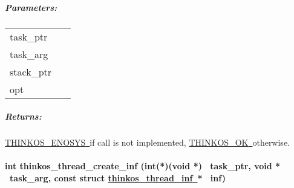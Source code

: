 \subparagraph{\texorpdfstring{{Parameters:}}{Parameters:}}\label{parameters}

\protect\hypertarget{t.f5730ae642f88aa6ce2571176ce1f624cbde4ea6}{}{}\protect\hypertarget{t.0}{}{}

\begin{longtable}[]{@{}ll@{}}
\toprule
\begin{minipage}[t]{0.47\columnwidth}\raggedright\strut
{task\_ptr}{~}\strut
\end{minipage} & \begin{minipage}[t]{0.47\columnwidth}\raggedright\strut
{}\strut
\end{minipage}\tabularnewline
\begin{minipage}[t]{0.47\columnwidth}\raggedright\strut
{task\_arg}{~}\strut
\end{minipage} & \begin{minipage}[t]{0.47\columnwidth}\raggedright\strut
{}\strut
\end{minipage}\tabularnewline
\begin{minipage}[t]{0.47\columnwidth}\raggedright\strut
{stack\_ptr}{~}\strut
\end{minipage} & \begin{minipage}[t]{0.47\columnwidth}\raggedright\strut
{}\strut
\end{minipage}\tabularnewline
\begin{minipage}[t]{0.47\columnwidth}\raggedright\strut
{opt}{~}\strut
\end{minipage} & \begin{minipage}[t]{0.47\columnwidth}\raggedright\strut
{}\strut
\end{minipage}\tabularnewline
\bottomrule
\end{longtable}

\subparagraph{\texorpdfstring{{Returns:}}{Returns:}}\label{returns}

{\protect\hyperlink{h.3s49zyc}{THINKOS\_ENOSYS}}{\protect\hyperlink{h.3s49zyc}{~}}{if
call is not implemented,
}{\protect\hyperlink{h.2fk6b3p}{THINKOS\_OK}}{\protect\hyperlink{h.2fk6b3p}{~}}{otherwise.
}

\paragraph{\texorpdfstring{{int thinkos\_thread\_create\_inf
(int(*)(void *) ~task\_ptr, void * ~task\_arg, const struct
}{\protect\hyperlink{h.2iq8gzs}{thinkos\_thread\_inf}}{\protect\hyperlink{h.2iq8gzs}{~}}{*
~inf)}}{int thinkos\_thread\_create\_inf (int(*)(void *) ~task\_ptr, void * ~task\_arg, const struct thinkos\_thread\_inf~* ~inf)}}\label{int-thinkos_thread_create_inf-intvoid-task_ptr-void-task_arg-const-struct-thinkos_thread_inf-inf}

